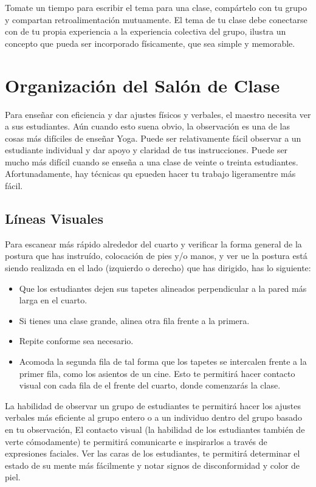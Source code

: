 Tomate un tiempo para escribir el tema para una clase, compártelo con tu grupo y compartan retroalimentación mutuamente. El tema de tu clase debe conectarse con de tu propia experiencia a la experiencia colectiva del grupo, ilustra un concepto que pueda ser incorporado físicamente, que sea simple y memorable.

\section{Organización del Salón de Clase}
Para enseñar con eficiencia y dar ajustes físicos y verbales, el maestro necesita ver a sus estudiantes. Aún cuando esto suena obvio, la observación es una de las cosas más difíciles de enseñar Yoga. Puede ser relativamente fácil observar a un estudiante individual y dar apoyo y claridad de tus instrucciones. Puede ser mucho más difícil cuando se enseña a una clase de veinte o treinta estudiantes. Afortunadamente, hay t\'ecnicas qu epueden hacer tu trabajo ligeramentre más fácil.

\subsection{Líneas Visuales}
Para escanear más rápido alrededor del cuarto y verificar la forma general de la postura que has instruído, colocación de pies y/o manos, y ver ue la postura está siendo realizada en el lado (izquierdo o derecho) que has dirigido, has lo siguiente:

\begin{itemize}
	\item Que los estudiantes dejen sus tapetes alineados perpendicular a la pared más larga en el cuarto.
	\item Si tienes una clase grande, alinea otra fila frente a la primera.
	\item Repite conforme sea necesario.
	\item Acomoda la segunda fila de tal forma que los tapetes se intercalen frente a la primer fila, como los asientos de un cine. Esto te permitirá hacer contacto visual con cada fila de el frente del cuarto, donde comenzarás la clase.
\end{itemize}

La habilidad de observar un grupo de estudiantes te permitirá hacer los ajustes verbales más eficiente al grupo entero o a un individuo dentro del grupo basado en tu observación, El contacto visual (la habilidad de los estudiantes tambi\'en de verte cómodamente) te permitirá comunicarte e inspirarlos a trav\'es de expresiones faciales. Ver las caras de los estudiantes, te permitirá determinar el estado de su mente más fácilmente y notar signos de disconformidad y color de piel.

